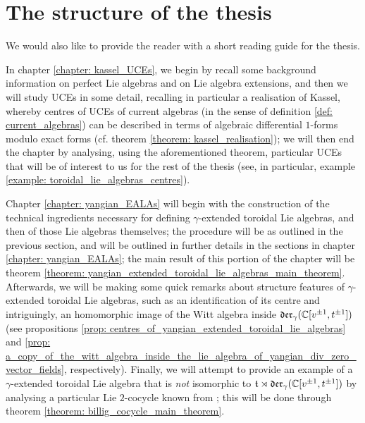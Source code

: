\section{The structure of the thesis}
    We would also like to provide the reader with a short reading guide for the thesis.
    
    In chapter \ref{chapter: kassel_UCEs}, we begin by recall some background information on perfect Lie algebras and on Lie algebra extensions, and then we will study UCEs in some detail, recalling in particular a realisation of Kassel, whereby centres of UCEs of current algebras (in the sense of definition \ref{def: current_algebras}) can be described in terms of algebraic differential $1$-forms modulo exact forms (cf. theorem \ref{theorem: kassel_realisation}); we will then end the chapter by analysing, using the aforementioned theorem, particular UCEs that will be of interest to us for the rest of the thesis (see, in particular, example \ref{example: toroidal_lie_algebras_centres}).

    Chapter \ref{chapter: yangian_EALAs} will begin with the construction of the technical ingredients necessary for defining $\gamma$-extended toroidal Lie algebras, and then of those Lie algebras themselves; the procedure will be as outlined in the previous section, and will be outlined in further details in the sections in chapter \ref{chapter: yangian_EALAs}; the main result of this portion of the chapter will be theorem \ref{theorem: yangian_extended_toroidal_lie_algebras_main_theorem}. Afterwards, we will be making some quick remarks about structure features of $\gamma$-extended toroidal Lie algebras, such as an identification of its centre and intriguingly, an homomorphic image of the Witt algebra inside $\mathfrak{der}_{\gamma}(\mathbb{C}[v^{\pm 1}, t^{\pm 1}])$ (see propositions \ref{prop: centres_of_yangian_extended_toroidal_lie_algebras} and \ref{prop: a_copy_of_the_witt_algebra_inside_the_lie_algebra_of_yangian_div_zero_vector_fields}, respectively). Finally, we will attempt to provide an example of a $\gamma$-extended toroidal Lie algebra that is \textit{not} isomorphic to $\mathfrak{t} \rtimes \mathfrak{der}_{\gamma}(\mathbb{C}[v^{\pm 1}, t^{\pm 1}])$ by analysing a particular Lie $2$-cocycle known from \cite{billig_energy_momentum_tensor}; this will be done through theorem \ref{theorem: billig_cocycle_main_theorem}.